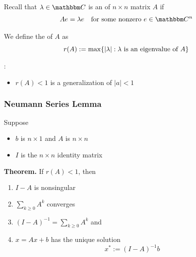 \begin{frame}

    Recall that $\lambda \in \CC$ is an  of $n \times n$ matrix $A$ if
    \begin{equation*}
        A e = \lambda e
        \quad \text{for some nonzero $e \in \CC^n$}
    \end{equation*}

    \vspace{1em}
    We define the  of $A$ as
    \begin{equation*}
        r(A) := \max\{ |\lambda| : \lambda \text{ is an eigenvalue of } A \}    
    \end{equation*}

    \vspace{1em}
    \vspace{1em}
    : 
    \begin{itemize}
        \item $r(A)<1$ is a generalization of $|a|<1$
    \end{itemize}



    
\end{frame}

\begin{frame}
    \frametitle{Neumann Series Lemma}

    Suppose 
    \begin{itemize}
        \item $b$ is $n \times 1$ and $A$ is $n \times n$ 
        \item $I$ is the $n \times n$ identity matrix
    \end{itemize}

    \vspace{0.5em}

    \vspace{0.5em}
    {\bf Theorem.} 
    If $r(A) < 1$, then
    \begin{enumerate}
        \item $I - A$ is nonsingular 
        \vspace{0.5em}
        \item $\sum_{k \geq 0} A^k$ converges 
        \vspace{0.5em}
        \item $(I - A)^{-1} = \sum_{k \geq 0} A^k$ and
        \vspace{0.5em}
        \item $x = A x + b$ has the unique solution 
            \begin{equation*}
                x^* := (I - A)^{-1} b 
            \end{equation*}
    \end{enumerate}

    
\end{frame}

